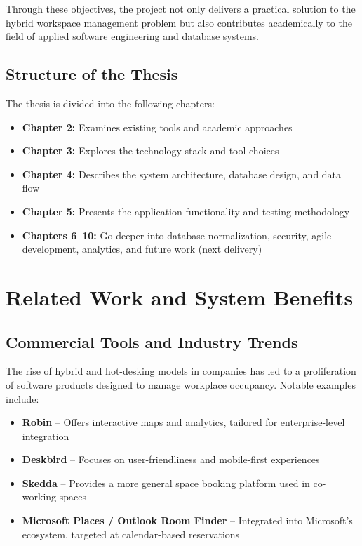 \documentclass[12pt,a4paper]{report}
\begin{document}
Through these objectives, the project not only delivers a practical solution to the hybrid workspace management problem but also contributes academically to the field of applied software engineering and database systems.

\section{Structure of the Thesis}

The thesis is divided into the following chapters:
\begin{itemize}
    \item \textbf{Chapter 2:} Examines existing tools and academic approaches
    \item \textbf{Chapter 3:} Explores the technology stack and tool choices
    \item \textbf{Chapter 4:} Describes the system architecture, database design, and data flow
    \item \textbf{Chapter 5:} Presents the application functionality and testing methodology
    \item \textbf{Chapters 6–10:} Go deeper into database normalization, security, agile development, analytics, and future work (next delivery)
\end{itemize}

\newpage

\chapter{Related Work and System Benefits}

\section{Commercial Tools and Industry Trends}

The rise of hybrid and hot-desking models in companies has led to a proliferation of software products designed to manage workplace occupancy. Notable examples include:
\begin{itemize}
    \item \textbf{Robin} – Offers interactive maps and analytics, tailored for enterprise-level integration
    \item \textbf{Deskbird} – Focuses on user-friendliness and mobile-first experiences
    \item \textbf{Skedda} – Provides a more general space booking platform used in co-working spaces
    \item \textbf{Microsoft Places / Outlook Room Finder} – Integrated into Microsoft’s ecosystem, targeted at calendar-based reservations
\end{itemize}
\end{document}
